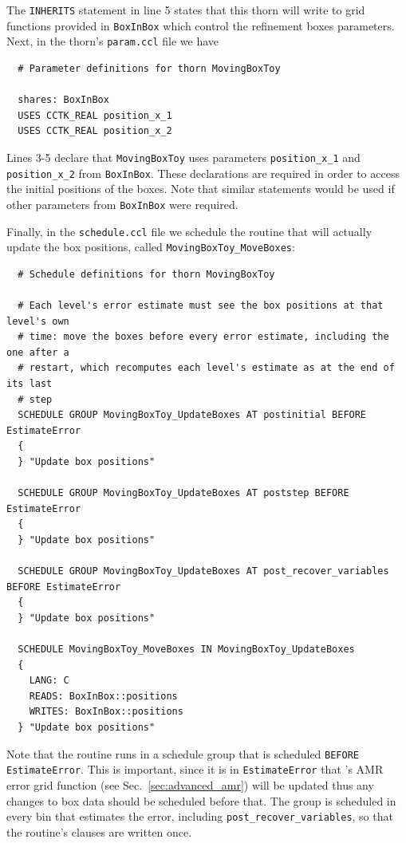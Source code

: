 The \texttt{INHERITS} statement in line 5 states that this thorn will write to grid functions provided in \texttt{BoxInBox} which control the refinement boxes parameters. Next, in the thorn's \texttt{param.ccl} file we have
%
\begin{lstlisting}
  # Parameter definitions for thorn MovingBoxToy

  shares: BoxInBox
  USES CCTK_REAL position_x_1
  USES CCTK_REAL position_x_2
\end{lstlisting}

Lines 3-5 declare that \texttt{MovingBoxToy} uses parameters \texttt{position\_x\_1} and \texttt{position\_x\_2} from \texttt{BoxInBox}. These declarations are required in order to access the initial positions of the boxes. Note that similar statements would be used if other parameters from \texttt{BoxInBox} were required.

Finally, in the \texttt{schedule.ccl} file we schedule the routine that will actually update the box positions, called \texttt{MovingBoxToy\_MoveBoxes}:
%
\begin{lstlisting}
  # Schedule definitions for thorn MovingBoxToy

  # Each level's error estimate must see the box positions at that level's own
  # time: move the boxes before every error estimate, including the one after a
  # restart, which recomputes each level's estimate as at the end of its last
  # step
  SCHEDULE GROUP MovingBoxToy_UpdateBoxes AT postinitial BEFORE EstimateError
  {
  } "Update box positions"

  SCHEDULE GROUP MovingBoxToy_UpdateBoxes AT poststep BEFORE EstimateError
  {
  } "Update box positions"

  SCHEDULE GROUP MovingBoxToy_UpdateBoxes AT post_recover_variables BEFORE EstimateError
  {
  } "Update box positions"

  SCHEDULE MovingBoxToy_MoveBoxes IN MovingBoxToy_UpdateBoxes
  {
    LANG: C
    READS: BoxInBox::positions
    WRITES: BoxInBox::positions
  } "Update box positions"
\end{lstlisting}

Note that the routine runs in a schedule group that is scheduled \texttt{BEFORE EstimateError}. This is important, since it is in \texttt{EstimateError} that \CarpetX's AMR error grid function (see Sec.~\ref{sec:advanced_amr}) will be updated thus any changes to box data should be scheduled before that. The group is scheduled in every bin that estimates the error, including \texttt{post\_recover\_variables}, so that the routine's clauses are written once.

